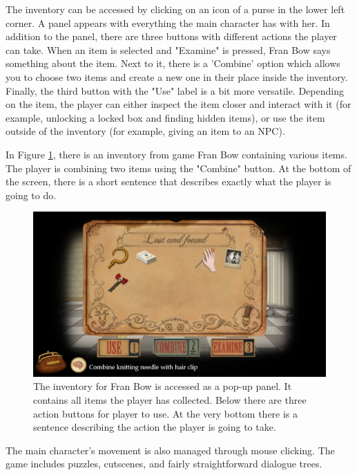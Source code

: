The inventory can be accessed by clicking on an icon of a purse in the lower left corner. A panel appears with everything the main character has with her. In addition to the panel, there are three buttons with different actions the player can take. When an item is selected and "Examine" is pressed, Fran Bow says something about the item. Next to it, there is a 'Combine' option which allows you to choose two items and create a new one in their place inside the inventory. Finally, the third button with the "Use" label is a bit more versatile. Depending on the item, the player can either inspect the item closer and interact with it (for example, unlocking a locked box and finding hidden items), or use the item outside of the inventory (for example, giving an item to an NPC).

In Figure \ref{fig:FranBow}, there is an inventory from game Fran Bow containing various items. The player is combining two items using the "Combine" button. At the bottom of the screen, there is a short sentence that describes exactly what the player is going to do.

\begin{figure}[H]
\centering
\includegraphics[width=1.\linewidth]{img/Fran_Bow.png}
\caption{The inventory for Fran Bow is accessed as a pop-up panel. It contains all items the player has collected. Below there are three action buttons for player to use. At the very bottom there is a sentence describing the action the player is going to take.}
\label{fig:FranBow}
\end{figure}

The main character's movement is also managed through mouse clicking. The game includes puzzles, cutscenes, and fairly straightforward dialogue trees.


